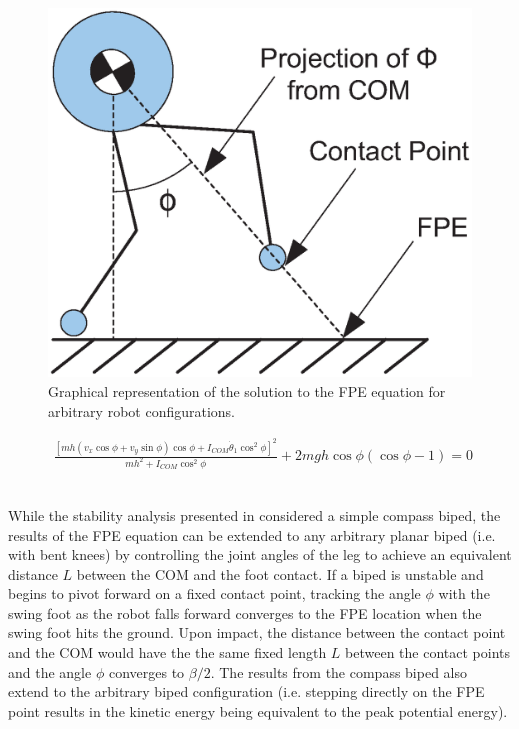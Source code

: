 \begin{figure}[!h]
	\centering
    \includegraphics[scale=0.6]{fig/ch4/fpeangle.eps}
  	\caption{Graphical representation of the solution to the FPE equation for arbitrary robot configurations.}
	\label{fig:fpeangle}
\end{figure}

\begin{figure}[!b]
	\begin{equation} \label{eq:fpe}
	\begin{aligned}
		\frac{{{{\left[ {mh({v_x}\cos \phi  + {v_y}\sin \phi )\cos \phi  + {I_{COM}}{{\dot \theta }_1}{{\cos }^2}\phi } \right]}^2}}}{{m{h^2} + {I_{COM}}{{\cos }^2}\phi }} + 2mgh\cos \phi (\cos \phi  - 1) = 0
	\end{aligned}
	\end{equation}
	\\
	\hrulefill
\end{figure}

While the stability analysis presented in \cite{Wight:2008ii} considered a simple compass biped, the results of the FPE equation can be extended to any arbitrary planar biped (i.e. with bent knees) by controlling the joint angles of the leg to achieve an equivalent distance $L$ between the COM and the foot contact. If a biped is unstable and begins to pivot forward on a fixed contact point, tracking the angle $\phi$ with the swing foot as the robot falls forward converges to the FPE location when the swing foot hits the ground. Upon impact, the distance between the contact point and the COM would have the the same fixed length $L$ between the contact points and the angle $\phi$ converges to $\beta/2$. The results from the compass biped also extend to the arbitrary biped configuration (i.e. stepping directly on the FPE point results in the kinetic energy being equivalent to the peak potential energy).


